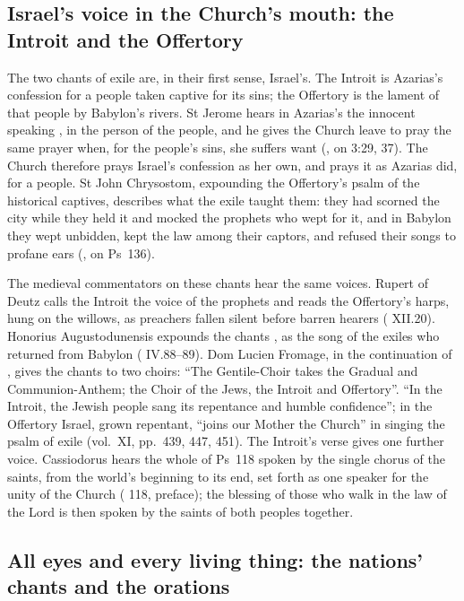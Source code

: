 \subsection{Israel's voice in the Church's mouth: the Introit and the Offertory}

The two chants of exile are, in their first sense, Israel's. The Introit is
Azarias's confession for a people taken captive for its sins; the Offertory is
the lament of that people by Babylon's rivers. St Jerome hears in Azarias's
 the innocent speaking , in the
person of the people, and he gives the Church leave to pray the same prayer
when, for the people's sins, she suffers want (,
on 3:29, 37). The Church therefore prays Israel's confession as her own, and
prays it as Azarias did, for a people. St John Chrysostom, expounding the
Offertory's psalm of the historical captives, describes what the exile taught
them: they had scorned the city while they held it and mocked the prophets who
wept for it, and in Babylon they wept unbidden, kept the law among their
captors, and refused their songs to profane ears (,
on Ps~136).

The medieval commentators on these chants hear the same voices. Rupert of
Deutz calls the Introit the voice of the prophets and reads the Offertory's
harps, hung on the willows, as preachers fallen silent before barren hearers
( XII.20). Honorius Augustodunensis expounds the
chants , as the song of the exiles who returned from Babylon
( IV.88--89). Dom Lucien Fromage, in the continuation of
, gives the chants to two choirs: ``The Gentile-Choir
takes the Gradual and Communion-Anthem; the Choir of the Jews, the Introit and
Offertory''. ``In the Introit, the Jewish people sang its repentance and humble
confidence''; in the Offertory Israel, grown repentant, ``joins our Mother the
Church'' in singing the psalm of exile (vol.~XI, pp.~439, 447, 451). The Introit's verse gives one further voice. Cassiodorus hears the whole of
Ps~118 spoken by the single chorus of the saints, from the world's beginning to
its end, set forth as one speaker for the unity of the Church
( 118, preface); the blessing of those who walk in
the law of the Lord is then spoken by the saints of both peoples together.

\subsection{All eyes and every living thing: the nations' chants and the orations}

